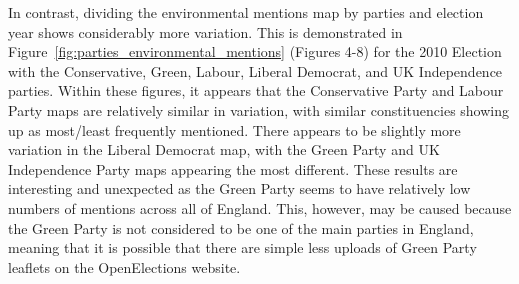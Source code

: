 \documentclass[preprint]{elsarticle} %
\begin{document}
In contrast, dividing the environmental mentions map by parties and election year shows considerably more variation. This is demonstrated in Figure~\ref{fig:parties_environmental_mentions} (Figures 4-8) for the 2010 Election with the Conservative, Green, Labour, Liberal Democrat, and UK Independence parties. Within these figures, it appears that the Conservative Party and Labour Party maps are relatively similar in variation, with similar constituencies showing up as most/least frequently mentioned. There appears to be slightly more variation in the Liberal Democrat map, with the Green Party and UK Independence Party maps appearing the most different. These results are interesting and unexpected as the Green Party seems to have relatively low numbers of mentions across all of England. This, however, may be caused because the Green Party is not considered to be one of the main parties in England, meaning that it is possible that there are simple less uploads of Green Party leaflets on the OpenElections website.
\end{document}
